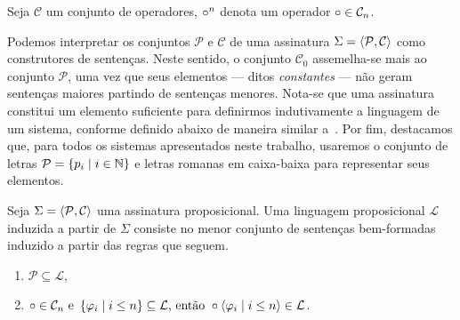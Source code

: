 \begin{tcolorbox}[enhanced jigsaw, breakable, sharp corners, colframe=black, colback=white, boxrule=0.5pt, left=1.5mm, right=1.5mm, top=1.5mm, bottom=1.5mm]
\begin{notation}
    Seja $\mathcal{C}$ um conjunto de operadores, $\mathalpha{\circ}^n$ denota um operador $\mathalpha{\circ}\in\mathcal{C}_n$.
\end{notation}
\end{tcolorbox}

\vspace{.5\baselineskip}
Podemos interpretar os conjuntos $\mathcal{P}$ e $\mathcal{C}$ de uma assinatura $\Sigma=\langle\mathcal{P},\mathcal{C}\rangle$ como construtores de sentenças.
Neste sentido, o conjunto $\mathcal{C}_0$ assemelha-se mais ao conjunto $\mathcal{P}$, uma vez que seus elementos --- ditos \emph{constantes} --- não geram sentenças maiores partindo de sentenças menores.
Nota-se que uma assinatura constitui um elemento suficiente para definirmos indutivamente a linguagem de um sistema, conforme definido abaixo de maneira similar a~\cite{Franks.2025}.
Por fim, destacamos que, para todos os sistemas apresentados neste trabalho, usaremos o conjunto de letras $\mathcal{P}=\left\{p_i\mid i\in\mathbb{N}\right\}$ e letras romanas em caixa-baixa para representar seus elementos.

\vspace{.5\baselineskip}
\begin{tcolorbox}[enhanced jigsaw, breakable, sharp corners, colframe=black, colback=white, boxrule=0.5pt, left=1.5mm, right=1.5mm, top=1.5mm, bottom=1.5mm]
\begin{definition}[Linguagem]
    Seja $\Sigma=\langle\mathcal{P},\mathcal{C}\rangle$ uma assinatura proposicional. Uma linguagem proposicional $\mathcal{L}$ induzida a partir de $\Sigma$ consiste no menor conjunto de sentenças bem-formadas induzido a partir das regras que seguem.
    \begin{enumerate}[label=\textbf{\emph{(\alph*)}}, left=\parindent]
        \item$\mathcal{P}\subseteq\mathcal{L}$,
        \item{}$\mathalpha{\circ}\in\mathcal{C}_n\text{ e }\set{\varphi_i\mid i\leq n}\subseteq\mathcal{L}\text{, então }\circ\sequence{\varphi_i\mid i\leq n}\in\mathcal{L}$.
    \end{enumerate}
\end{definition}
\end{tcolorbox}


